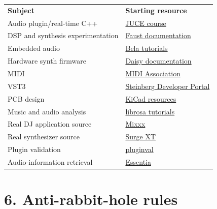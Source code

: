 \documentclass[11pt,letterpaper]{article}
\begin{document}
\begin{center}
\small
\begin{tabular}{>{\raggedright\arraybackslash}p{}>{\raggedright\arraybackslash}p{}}
\textbf{Subject} & \textbf{Starting resource} \\
Audio plugin/real-time C++ & \href{https://juce.com/learn/course/}{JUCE course} \\
DSP and synthesis experimentation & \href{https://faustdoc.grame.fr/}{Faust documentation} \\
Embedded audio & \href{https://learn.bela.io/tutorials/}{Bela tutorials} \\
Hardware synth firmware & \href{https://docs.daisy.audio/}{Daisy documentation} \\
MIDI & \href{https://midi.org/midi-2-0}{MIDI Association} \\
VST3 & \href{https://steinbergmedia.github.io/vst3_dev_portal/}{Steinberg Developer Portal} \\
PCB design & \href{https://www.kicad.org/help/learning-resources/}{KiCad resources} \\
Music and audio analysis & \href{https://librosa.org/doc/latest/auto_tutorials/}{librosa tutorials} \\
Real DJ application source & \href{https://github.com/mixxxdj/mixxx}{Mixxx} \\
Real synthesizer source & \href{https://github.com/surge-synthesizer/surge}{Surge XT} \\
Plugin validation & \href{https://github.com/Tracktion/pluginval}{pluginval} \\
Audio-information retrieval & \href{https://essentia.upf.edu/}{Essentia} \\
\end{tabular}
\end{center}

\section{6. Anti-rabbit-hole rules}\label{anti-rabbit-hole-rules}
\end{document}
